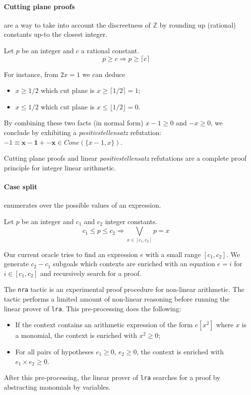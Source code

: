 \paragraph{Cutting plane proofs} are a way to take into account the discreetness of $\mathbb{Z}$ by rounding up
(rational) constants up-to the closest integer. 
%
\begin{theorem}
  Let $p$ be an integer and $c$ a rational constant.
  \[
  p \ge c \Rightarrow p \ge \lceil c \rceil
  \]
\end{theorem}
For instance, from $2 x = 1$ we can deduce
\begin{itemize}
\item $x \ge 1/2$ which cut plane is $ x \ge \lceil 1/2 \rceil = 1$;
\item $ x \le 1/2$ which cut plane is $ x \le \lfloor 1/2 \rfloor = 0$.
\end{itemize}
By combining these two facts (in normal form) $x - 1 \ge 0$ and $-x \ge
0$, we conclude by exhibiting a \emph{positivstellensatz} refutation: $-1
\equiv \mathbf{x-1} + \mathbf{-x} \in \mathit{Cone}(\{x-1,x\})$.

Cutting plane proofs and linear \emph{positivstellensatz} refutations are a complete proof principle for integer linear arithmetic.

\paragraph{Case split} enumerates over the possible values of an expression.
\begin{theorem}
  Let $p$ be an integer and $c_1$ and $c_2$  integer constants.
  \[
  c_1 \le p \le c_2 \Rightarrow \bigvee_{x \in [c_1,c_2]} p = x
  \]
\end{theorem}
Our current oracle tries to find an expression $e$ with a small range $[c_1,c_2]$.
%
We generate $c_2 - c_1$ subgoals which contexts are enriched with an equation $e = i$ for $i \in [c_1,c_2]$ and
recursively search for a proof.


\label{sec:nra}
The {\tt nra} tactic is an {\emph experimental} proof procedure for non-linear arithmetic.
%
The tactic performs a limited amount of non-linear reasoning before running the
linear prover of {\tt lra}.
This pre-processing does the following:
\begin{itemize}
\item If the context contains an arithmetic expression of the form $e[x^2]$ where $x$ is a
  monomial, the context is enriched with $x^2\ge 0$;
\item For all pairs of hypotheses $e_1\ge 0$, $e_2 \ge 0$, the context is enriched with $e_1 \times e_2 \ge 0$.
\end{itemize}
After this pre-processing, the linear prover of {\tt lra} searches for a proof
by abstracting monomials by variables.

